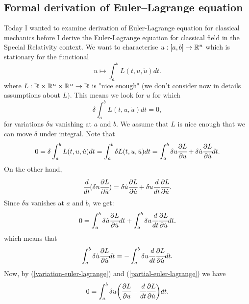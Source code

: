 \documentclass[main.tex]{subfiles}
\begin{document}
\subsection{Formal derivation of Euler–Lagrange equation}
Today I wanted to examine derivation of Euler-Lagrange equation for classical mechanics before I derive the Euler-Lagrange equation for classical field in the Special Relativity context.  
We want to characterise $u:[a,b]\to \mathbb{R}^n$ which is stationary for the functional 
\begin{equation}
u \mapsto \int_a^b L(t, u, \dot{u})dt.
\end{equation}
where $L:\mathbb{R}\times\mathbb{R}^n\times\mathbb{R}^n\to\mathbb{R}$ is "nice enough" (we don't consider now in details assumptions about $L)$. This means we look for $u$ for which 
\begin{equation}
\delta \int_a^b L(t, u, \dot{u})dt = 0,
\end{equation}
for variations $\delta u$ vanishing at $a$ and $b$.
We assume that $L$ is nice enough that we can move $\delta$ under integral. Note that
\begin{equation}
\label{variation-euler-lagrange}
0 = \delta \int_a^b L(t, u, \dot{u})dt = \int_a^b \delta L(t, u, \dot{u})dt =
\int_a^b \delta u  \cfrac{\partial L}{\partial u} + \delta \dot{u} \cfrac{\partial L}{\partial \dot{u}}dt.  
\end{equation}
On the other hand,
\begin{equation}
\cfrac{d}{dt}(\delta u \cfrac{\partial L}{\partial \dot{u}}) =
\delta\dot{u} \cfrac{\partial L}{\partial \dot{u}} + \delta u \cfrac{d}{dt}\cfrac{\partial L}{\partial \dot{u}}.
\end{equation}
Since $\delta u$ vanishes at $a$ and $b$, we get:
\begin{equation}
0 = \int_a^b \delta\dot{u} \cfrac{\partial L}{\partial \dot{u}}dt + 
\int_a^b \delta u\cfrac{d}{dt}\cfrac{\partial L}{\partial \dot{u}}dt.
\end{equation}
which means that
\begin{equation}
\label{partial-euler-lagrange}
\int_a^b \delta\dot{u} \cfrac{\partial L}{\partial \dot{u}}dt = - 
\int_a^b \delta u\cfrac{d}{dt}\cfrac{\partial L}{\partial \dot{u}}dt.
\end{equation}
Now, by (\ref{variation-euler-lagrange}) and (\ref{partial-euler-lagrange}) we have
\begin{equation}
0 = \int_a^b \delta u\bigg(\cfrac{\partial L}{\partial u} -
 \cfrac{d}{dt}\cfrac{\partial L}{\partial \dot{u}} \bigg)dt.
\end{equation}
\end{document}
